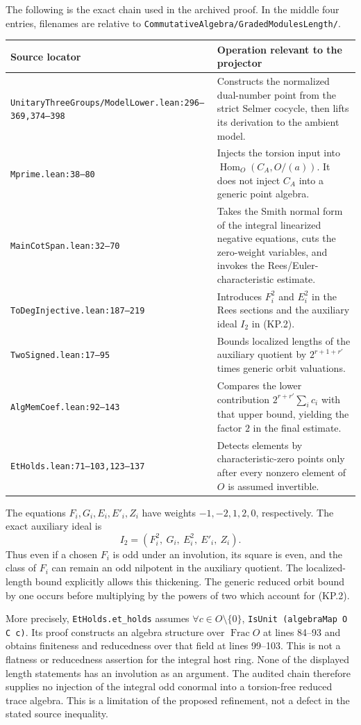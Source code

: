 The following is the exact chain used in the archived proof.
In the middle four entries, filenames are relative to
\texttt{CommutativeAlgebra/GradedModulesLength/}.
\begin{center}
\begin{tabular}{p{}p{}}
\textbf{Source locator} & \textbf{Operation relevant to the projector}\\\hline
\texttt{UnitaryThreeGroups/ModelLower.lean:296--369,374--398}
 & Constructs the normalized dual-number point from the strict
 Selmer cocycle, then lifts its derivation to the ambient model.\\
\texttt{Mprime.lean:38--80}
 & Injects the torsion input into
 $\operatorname{Hom}_O(C_A,O/(a))$.  It does not inject $C_A$
 into a generic point algebra.\\
\texttt{MainCotSpan.lean:32--70}
 & Takes the Smith normal form of the integral linearized
 negative equations, cuts the zero-weight variables, and invokes
 the Rees/Euler-characteristic estimate.\\
\texttt{ToDegInjective.lean:187--219}
 & Introduces $F_i^2$ and $E_i^2$ in the Rees sections and the
 auxiliary ideal $I_2$ in (KP.2).\\
\texttt{TwoSigned.lean:17--95}
 & Bounds localized lengths of the auxiliary quotient by
 $2^{r+1+r'}$ times generic orbit valuations.\\
\texttt{AlgMemCoef.lean:92--143}
 & Compares the lower contribution
 $2^{r+r'}\sum_i c_i$ with that upper bound, yielding the factor
 $2$ in the final estimate.\\
\texttt{EtHolds.lean:71--103,123--137}
 & Detects elements by characteristic-zero points only after
 every nonzero element of $O$ is assumed invertible.\\
\end{tabular}
\end{center}
The equations $F_i,G_i,E_i,E'_i,Z_i$ have weights
$-1,-2,1,2,0$, respectively.  The exact auxiliary ideal is
\[
        I_2=(F_i^2,\ G_i,\ E_i^2,\ E'_i,\ Z_i).              \tag{KP.2}
\]
Thus even if a chosen $F_i$ is odd under an involution,
its square is even, and the class of $F_i$ can remain an odd
nilpotent in the auxiliary quotient.  The localized-length
bound explicitly allows this thickening.  The generic reduced
orbit bound by one occurs before multiplying by the powers of
two which account for (KP.2).

More precisely, \texttt{EtHolds.et\_holds} assumes
$\forall c\in O\setminus\{0\}$, \texttt{IsUnit (algebraMap O C c)}.
Its proof constructs an algebra structure over $\operatorname{Frac}O$
at lines 84--93 and obtains finiteness and reducedness over that
field at lines 99--103.  This is not a flatness or reducedness
assertion for the integral host ring.  None of the displayed
length statements has an involution as an argument.  The audited
chain therefore supplies no injection of the integral odd
conormal into a torsion-free reduced trace algebra.  This is a
limitation of the proposed refinement, not a defect in the
stated source inequality.

